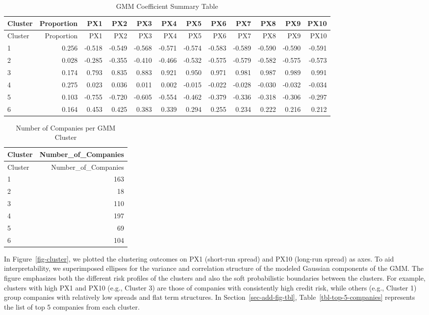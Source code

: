 \documentclass[
  letterpaper,
  DIV=11,
  numbers=noendperiod]{scrartcl}
\begin{document}
\hypertarget{tbl-model-sum}{}
\begin{longtable}[]{@{}lrrrrrrrrrrr@{}}
\caption{\label{tbl-model-sum}GMM Coefficient Summary
Table}\tabularnewline
\toprule()
Cluster & Proportion & PX1 & PX2 & PX3 & PX4 & PX5 & PX6 & PX7 & PX8 &
PX9 & PX10 \\
\midrule()
\endfirsthead
\toprule()
Cluster & Proportion & PX1 & PX2 & PX3 & PX4 & PX5 & PX6 & PX7 & PX8 &
PX9 & PX10 \\
\midrule()
\endhead
1 & 0.256 & -0.518 & -0.549 & -0.568 & -0.571 & -0.574 & -0.583 & -0.589
& -0.590 & -0.590 & -0.591 \\
2 & 0.028 & -0.285 & -0.355 & -0.410 & -0.466 & -0.532 & -0.575 & -0.579
& -0.582 & -0.575 & -0.573 \\
3 & 0.174 & 0.793 & 0.835 & 0.883 & 0.921 & 0.950 & 0.971 & 0.981 &
0.987 & 0.989 & 0.991 \\
4 & 0.275 & 0.023 & 0.036 & 0.011 & 0.002 & -0.015 & -0.022 & -0.028 &
-0.030 & -0.032 & -0.034 \\
5 & 0.103 & -0.755 & -0.720 & -0.605 & -0.554 & -0.462 & -0.379 & -0.336
& -0.318 & -0.306 & -0.297 \\
6 & 0.164 & 0.453 & 0.425 & 0.383 & 0.339 & 0.294 & 0.255 & 0.234 &
0.222 & 0.216 & 0.212 \\
\bottomrule()
\end{longtable}

\hypertarget{tbl-cluster-summary}{}
\begin{longtable}[]{@{}lr@{}}
\caption{\label{tbl-cluster-summary}Number of Companies per GMM
Cluster}\tabularnewline
\toprule()
Cluster & Number\_of\_Companies \\
\midrule()
\endfirsthead
\toprule()
Cluster & Number\_of\_Companies \\
\midrule()
\endhead
1 & 163 \\
2 & 18 \\
3 & 110 \\
4 & 197 \\
5 & 69 \\
6 & 104 \\
\bottomrule()
\end{longtable}

In Figure~\ref{fig-cluster}, we plotted the clustering outcomes on PX1
(short-run spread) and PX10 (long-run spread) as axes. To aid
interpretability, we superimposed ellipses for the variance and
correlation structure of the modeled Gaussian components of the GMM. The
figure emphasizes both the different risk profiles of the clusters and
also the soft probabilistic boundaries between the clusters. For
example, clusters with high PX1 and PX10 (e.g., Cluster 3) are those of
companies with consistently high credit risk, while others (e.g.,
Cluster 1) group companies with relatively low spreads and flat term
structures. In Section~\ref{sec-add-fig-tbl},
Table~\ref{tbl-top-5-companies} represents the list of top 5 companies
from each cluster.
\end{document}
